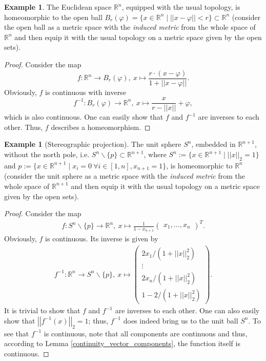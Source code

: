 \documentclass[12pt, a4paper]{article}
\numberwithin{equation}{section}
\theoremstyle{definition}
\theoremstyle{definition}
\newtheorem{exmp}[thm]{Example} %
\newcommand{\norm}[2]{\left\vert\left\vert #1 \right\vert\right\vert_{#2}}
\begin{document}
		\begin{exmp}
			The Euclidean space $\mathbb R^n$, equipped with the usual topology, is homeomorphic to the open ball $B_{r}(\varphi) =  \{x\in\mathbb R^n \mid \lvert\lvert x-\varphi \rvert\rvert < r \} \subset \mathbb R^n$ (consider the open ball as a metric space with the \textit{induced metric} from the whole space of $\mathbb R^n$ and then equip it with the usual topology on a metric space given by the open sets). 
		\end{exmp}
		
		\begin{proof}
			Consider the map $$f: \mathbb R^n\rightarrow B_r(\varphi), \ x\mapsto \frac{r\cdot (x-\varphi)}{1+\lvert\lvert x-\varphi\rvert\rvert}.$$ Obviously, $f$ is continuous with inverse $$f^{-1}: B_r(\varphi)\rightarrow \mathbb R^n, \ x \mapsto \frac{x}{r-\lvert\lvert x\rvert\rvert}+\varphi,$$ which is also continuous. One can easily show that $f$ and $f^{-1}$ are inverses to each other. Thus, $f$ describes a homeomorphism. 	
		\end{proof}
				
		\begin{exmp}[Stereographic projection]
			The unit sphere $S^n$, embedded in $\mathbb R^{n+1}$, without the north pole, i.e. $S^n\backslash \{p\} \subset \mathbb R^{n+1}$, where $S^n := \{ x\in\mathbb R^{n+1} \mid \norm{x}{2} = 1 \}$ and $p := \{ x\in\mathbb R^{n+1} \mid x_i = 0 \ \forall i\in[1, n], x_{n+1} = 1 \}$, is homeomorphic to $\mathbb R^n$ (consider the unit sphere as a metric space with the \textit{induced metric} from the whole space of $\mathbb R^{n+1}$ and then equip it with the usual topology on a metric space given by the open sets). 
		\end{exmp}
		\begin{proof}
			Consider the map 
			\begin{align}
				f: S^n\backslash\{p\}\rightarrow \mathbb R^n, \ x\mapsto \frac{1}{1-x_{n+1}}\begin{pmatrix} x_1, \dots, x_n \end{pmatrix}^T. 
			\end{align}
			Obviously, $f$ is continuous. Its inverse is given by 
			\begin{align}\label{stereographic_map_inverse}
				f^{-1}: \mathbb R^n \rightarrow S^n\backslash\{p\}, \ x\mapsto \begin{pmatrix} 2x_1/ \left(1+\norm{x}{2}^2\right)\\ \vdots\\ 2x_n/\left(1+\norm{x}{2}^2\right) \\[4pt] 1-2/\left(1+\norm{x}{2}^2\right) \end{pmatrix}.  
			\end{align}
			It is trivial to show that $f$ and $f^{-1}$ are inverses to each other. One can also easily show that $\norm{f^{-1}(x)}{2} = 1$; thus, $f^{-1}$ does indeed bring us to the unit ball $S^n$. 
			To see that $f^{-1}$ is continuous, note that all components are continuous and thus, according to Lemma \ref{continuity_vector_components}, the function itself is continuous. 
		\end{proof} 
	
\end{document}
